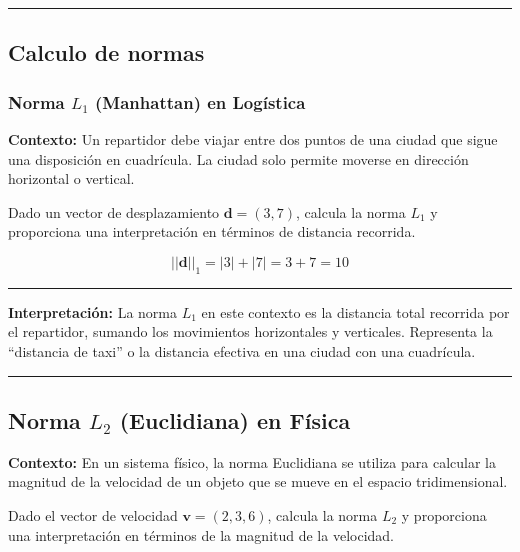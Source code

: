 \documentclass[
  letterpaper,
  DIV=11,
  numbers=noendperiod]{scrartcl}
\begin{document}
\begin{center}\rule{0.5\linewidth}{0.5pt}\end{center}

\subsection{Calculo de normas}\label{calculo-de-normas}

\subsubsection{\texorpdfstring{Norma \(L_1\) (Manhattan) en
Logística}{Norma L\_1 (Manhattan) en Logística}}\label{norma-l_1-manhattan-en-loguxedstica}

\textbf{Contexto:} Un repartidor debe viajar entre dos puntos de una
ciudad que sigue una disposición en cuadrícula. La ciudad solo permite
moverse en dirección horizontal o vertical.

Dado un vector de desplazamiento \(\mathbf{d} = (3, 7)\), calcula la
norma \(L_1\) y proporciona una interpretación en términos de distancia
recorrida.

\[
||\mathbf{d}||_1 = |3| + |7| = 3 + 7 = 10
\]

\begin{center}\rule{0.5\linewidth}{0.5pt}\end{center}

\textbf{Interpretación:} La norma \(L_1\) en este contexto es la
distancia total recorrida por el repartidor, sumando los movimientos
horizontales y verticales. Representa la ``distancia de taxi'' o la
distancia efectiva en una ciudad con una cuadrícula.

\begin{center}\rule{0.5\linewidth}{0.5pt}\end{center}

\subsection{\texorpdfstring{Norma \(L_2\) (Euclidiana) en
Física}{Norma L\_2 (Euclidiana) en Física}}\label{norma-l_2-euclidiana-en-fuxedsica}

\textbf{Contexto:} En un sistema físico, la norma Euclidiana se utiliza
para calcular la magnitud de la velocidad de un objeto que se mueve en
el espacio tridimensional.

Dado el vector de velocidad \(\mathbf{v} = (2, 3, 6)\), calcula la norma
\(L_2\) y proporciona una interpretación en términos de la magnitud de
la velocidad.
\end{document}
